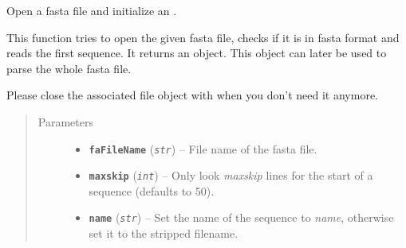 \documentclass[letterpaper,10pt,english]{sphinxmanual}
\begin{document}
\begin{fulllineitems}
\label{fasta:libPoMo.fasta.init_seq}
Open a fasta file and initialize an {\hyperref[fasta:libPoMo.fasta.FaStream]{}}.

This function tries to open the given fasta file, checks if it is
in fasta format and reads the first sequence.  It returns an
{\hyperref[fasta:libPoMo.fasta.FaStream]{}} object. This object can later be used to parse
the whole fasta file.

Please close the associated file object with
{\hyperref[fasta:libPoMo.fasta.FaStream.close]{}} when you don't need it anymore.
\begin{quote}\begin{description}
\item[{Parameters}] \leavevmode\begin{itemize}
\item {} 
\textbf{\texttt{faFileName}} (\emph{\texttt{str}}) -- File name of the fasta file.

\item {} 
\textbf{\texttt{maxskip}} (\emph{\texttt{int}}) -- Only look \emph{maxskip} lines for the start of a
sequence (defaults to 50).

\item {} 
\textbf{\texttt{name}} (\emph{\texttt{str}}) -- Set the name of the sequence to \emph{name}, otherwise
set it to the stripped filename.

\end{itemize}

\end{description}\end{quote}

\end{fulllineitems}

\end{document}
